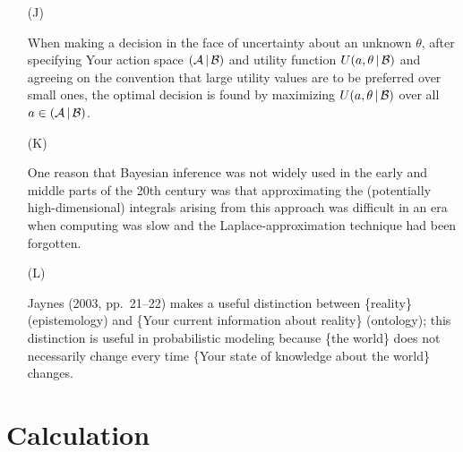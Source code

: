\documentclass[12pt]{article}
\newcommand{\given}{\, | \,}
\newcommand{\given}{\, | \,}
\begin{document}
\begin{itemize}
\item[(J)]

When making a decision in the face of uncertainty about an unknown $\theta$, after specifying Your action space $( { \cal A } \given { \cal B } )$ and utility function $U ( a, \theta \given { \cal B } )$ and agreeing on the convention that large utility values are to be preferred over small ones, the optimal decision is found by maximizing $U ( a, \theta \given { \cal B } )$ over all $a \in ( { \cal A } \given { \cal B } )$.

\item[(K)]

One reason that Bayesian inference was not widely used in the early and middle parts of
the 20th century was that approximating the (potentially high-dimensional)
integrals arising from this approach was difficult in an era when computing
was slow and the Laplace-approximation technique had been forgotten.

\item[(L)]

Jaynes (2003, pp.~21--22) makes a useful distinction between
\{reality\} (epistemology) and \{Your current information about reality\}
(ontology); this distinction is useful in probabilistic modeling because
\{the world\} does not necessarily change every time \{Your state of
knowledge about the world\} changes.

\end{itemize}

\section{Calculation}
\end{document}
